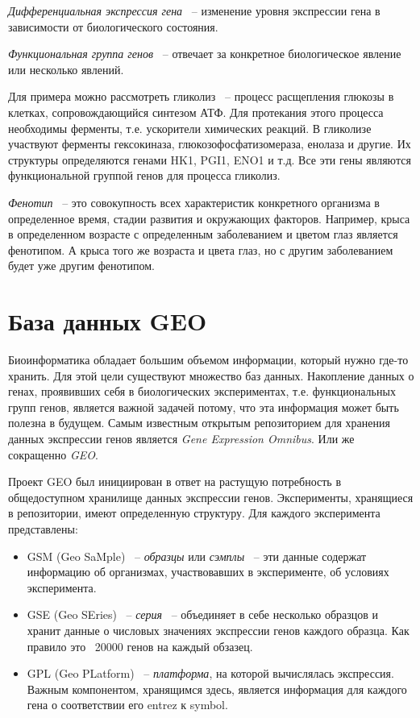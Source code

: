 \documentclass[times,specification,annotation]{itmo-student-thesis}
\begin{document}
\textit{Дифференциальная экспрессия гена} ~-- изменение уровня экспрессии гена в зависимости от биологического состояния.

\textit{Функциональная группа генов} ~-- отвечает за конкретное биологическое явление или несколько явлений. 

Для примера можно рассмотреть гликолиз ~-- процесс расщепления глюкозы в клетках, сопровождающийся синтезом АТФ. Для протекания этого процесса необходимы ферменты, т.е. ускорители химических реакций. В гликолизе участвуют ферменты гексокиназа, глюкозофосфатизомераза, енолаза и другие. Их структуры определяются генами HK1, PGI1, ENO1 и т.д.\cite{Glycolysis} Все эти гены являются функциональной группой генов для процесса гликолиз.

\textit{Фенотип} ~-- это совокупность всех характеристик конкретного организма в определенное время, стадии развития и окружающих факторов. Например, крыса в определенном возрасте с определенным заболеванием и цветом глаз является фенотипом. А крыса того же возраста и цвета глаз, но с другим заболеванием будет уже другим фенотипом. 

\section{База данных GEO}

Биоинформатика обладает большим объемом информации, который нужно где-то хранить. Для этой цели существуют множество баз данных. Накопление данных о генах, проявивших себя в биологических экспериментах, т.е. функциональных групп генов, является важной задачей потому, что эта информация может быть полезна в будущем. Самым известным открытым репозиторием для хранения данных экспрессии генов является \textit{Gene Expression Omnibus}. Или же сокращенно \textit{GEO}.

Проект GEO был инициирован в ответ на растущую потребность в общедоступном хранилище данных экспрессии генов.\cite{GEO} Эксперименты, хранящиеся в репозитории, имеют определенную структуру. Для каждого эксперимента представлены: 
\begin{itemize}
    \item GSM (Geo SaMple) ~-- \textit{образцы} или \textit{сэмплы} ~-- эти данные содержат информацию об организмах, участвовавших в эксперименте, об условиях эксперимента.
    \item GSE (Geo SEries) ~-- \textit{серия} ~-- объединяет в себе несколько образцов и хранит данные о числовых значениях экспрессии генов каждого образца. Как правило это ~20000 генов на каждый обзазец.
    \item GPL (Geo PLatform) ~-- \textit{платформа}, на которой вычислялась экспрессия. Важным компонентом, хранящимся здесь, является информация для каждого гена о соответствии его entrez к symbol.     
\end{itemize}
\end{document}
